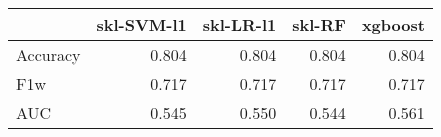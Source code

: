 \begin{tabular}{lrrrr}
\toprule
{} &  skl-SVM-l1 &  skl-LR-l1 &  skl-RF &  xgboost \\
\midrule
Accuracy &       0.804 &      0.804 &   0.804 &    0.804 \\
F1w      &       0.717 &      0.717 &   0.717 &    0.717 \\
AUC      &       0.545 &      0.550 &   0.544 &    0.561 \\
\bottomrule
\end{tabular}
